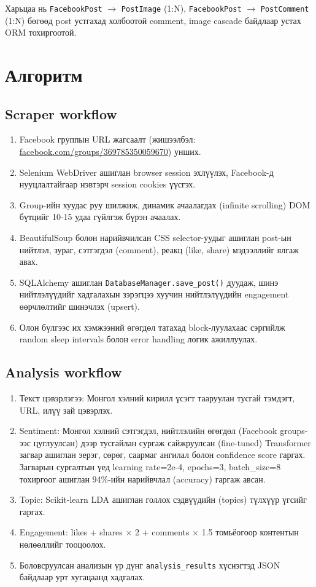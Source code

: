 \documentclass[
12pt,
oneside,
english,
onehalfspacing,
nolistspacing,
headsepline,
]{MUST-Thesis}
\begin{document}
Харьцаа нь \texttt{FacebookPost} $\rightarrow$ \texttt{PostImage} (1:N), \texttt{FacebookPost} $\rightarrow$ \texttt{PostComment} (1:N) бөгөөд post устгахад холбоотой comment, image cascade байдлаар устах ORM тохиргоотой.

\section{Алгоритм}

\subsection{Scraper workflow}
\begin{enumerate}
    \item Facebook группын URL жагсаалт (жишээлбэл: \url{facebook.com/groups/369785350059670}) унших.
    \item Selenium WebDriver ашиглан browser session эхлүүлэх, Facebook-д нууцлалтайгаар нэвтэрч session cookies үүсгэх.
    \item Group-ийн хуудас руу шилжиж, динамик ачаалагдах (infinite scrolling) DOM бүтцийг 10-15 удаа гүйлгэж бүрэн ачаалах.
    \item BeautifulSoup болон нарийвчилсан CSS selector-уудыг ашиглан post-ын нийтлэл, зураг, сэтгэгдэл (comment), реакц (like, share) мэдээллийг ялгаж авах.
    \item SQLAlchemy ашиглан \texttt{DatabaseManager.save\_post()} дуудаж, шинэ нийтлэлүүдийг хадгалахын зэрэгцээ хуучин нийтлэлүүдийн engagement өөрчлөлтийг шинэчлэх (upsert).
    \item Олон бүлгээс их хэмжээний өгөгдөл татахад block-луулахаас сэргийлж random sleep intervals болон error handling логик ажиллуулах.
\end{enumerate}

\subsection{Analysis workflow}
\begin{enumerate}
    \item Текст цэвэрлэгээ: Монгол хэлний кирилл үсэгт тааруулан тусгай тэмдэгт, URL, илүү зай цэвэрлэх.
    \item Sentiment: Монгол хэлний сэтгэгдэл, нийтлэлийн өгөгдөл (Facebook groups-ээс цуглуулсан) дээр тусгайлан сургаж сайжруулсан (fine-tuned) Transformer загвар ашиглан эерэг, сөрөг, саармаг ангилал болон confidence score гаргах. Загварын сургалтын үед learning rate=2e-4, epochs=3, batch\_size=8 тохиргоог ашиглан 94\%-ийн нарийвчлал (accuracy) гаргаж авсан.
    \item Topic: Scikit-learn LDA ашиглан голлох сэдвүүдийн (topics) түлхүүр үгсийг гаргах.
    \item Engagement: likes + shares $\times$ 2 + comments $\times$ 1.5 томьёогоор контентын нөлөөллийг тооцоолох.
    \item Боловсруулсан анализын үр дүнг \texttt{analysis\_results} хүснэгтэд JSON байдлаар урт хугацаанд хадгалах.
\end{enumerate}
\end{document}
